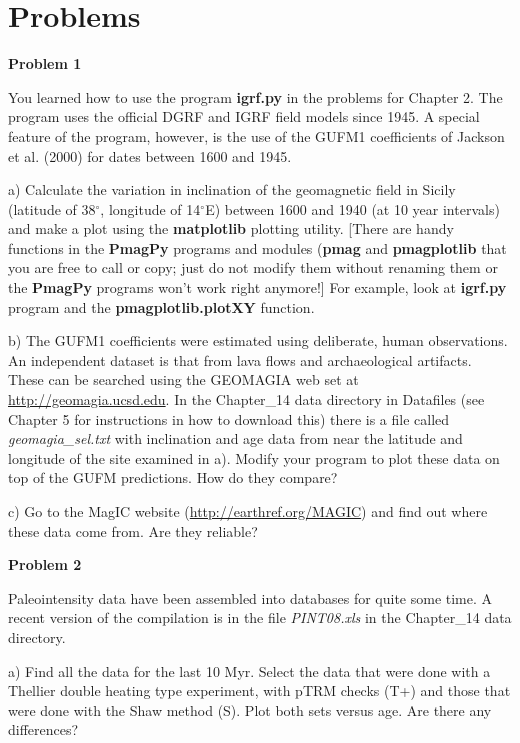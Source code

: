 \section{Problems}
{\parindent 0pt  \parskip 12pt
{\bf Problem 1}   

You learned how to use the program {\bf igrf.py} in the problems for Chapter 2. The program uses the official DGRF and IGRF field models since 1945.  A special feature of the program, however, is the use of the GUFM1 coefficients of 
 \nocite{jackson00}
Jackson et al. (2000) for dates between 1600 and 1945.  

a) Calculate the variation in inclination of the geomagnetic field in Sicily (latitude of 38$^{\circ}$, longitude of 14$^{\circ}$E) between 1600 and 1940 (at 10 year intervals) and make a plot using the {\bf matplotlib} plotting utility.  [There are handy  functions in the {\bf PmagPy} programs and modules ({\bf pmag} and {\bf pmagplotlib} that you are free to call or copy; just do not modify them without renaming them or the {\bf PmagPy} programs won't work right anymore!]   For example, look at {\bf igrf.py} program and  the {\bf pmagplotlib.plotXY} function.

b)  The GUFM1 coefficients were estimated using deliberate, human observations.   An independent dataset is that from lava flows and archaeological artifacts.  These can be searched using the GEOMAGIA web set at \url{http://geomagia.ucsd.edu}.
In the Chapter\_14 data directory in Datafiles (see Chapter 5 for instructions in how to download this) there is a file called {\it geomagia\_sel.txt} with inclination and age data from near the latitude and longitude  of the site examined in a).     Modify your program to plot these data on top of the GUFM predictions.  How do they compare?  

c) Go to the MagIC website (\url{http://earthref.org/MAGIC}) and find out where these data come from.  Are they reliable?  

{\bf Problem 2}


Paleointensity data have been assembled into databases for quite some time.  A recent version of the compilation is in the file {\it PINT08.xls} in the Chapter\_14 data directory.  

a)  Find all the data for the last 10 Myr.  
Select the data that were done with a Thellier double heating type experiment, with pTRM checks (T+) and those that were done with the Shaw method (S).   Plot both sets versus age.  Are there any differences?  

}
